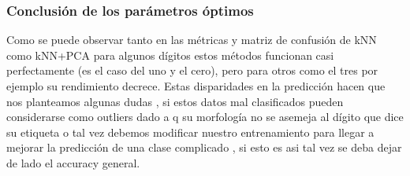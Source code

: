 \subsubsection{Conclusión de los parámetros óptimos}


Como se puede observar tanto en las métricas y matriz de confusión de kNN como kNN+PCA para algunos dígitos estos métodos funcionan casi perfectamente (es el caso del uno y el cero), pero para otros como el tres por ejemplo su rendimiento decrece. Estas disparidades en la predicción hacen que nos planteamos algunas dudas , si estos datos mal clasificados pueden considerarse como outliers dado a q su morfología no se asemeja al dígito que dice su etiqueta o tal vez debemos modificar nuestro entrenamiento para llegar a mejorar la predicción de una clase complicado , si esto es asi tal vez se deba dejar de lado el accuracy general.

